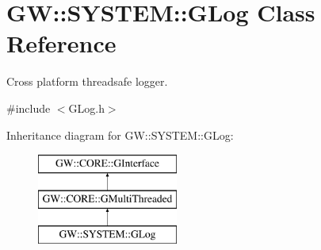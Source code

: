\hypertarget{class_g_w_1_1_s_y_s_t_e_m_1_1_g_log}{}\section{GW\+:\+:S\+Y\+S\+T\+EM\+:\+:G\+Log Class Reference}
\label{class_g_w_1_1_s_y_s_t_e_m_1_1_g_log}


Cross platform threadsafe logger.  




{\ttfamily \#include $<$G\+Log.\+h$>$}

Inheritance diagram for GW\+:\+:S\+Y\+S\+T\+EM\+:\+:G\+Log\+:\begin{figure}[H]
\begin{center}
\leavevmode
\includegraphics[height=3.000000cm]{class_g_w_1_1_s_y_s_t_e_m_1_1_g_log}
\end{center}
\end{figure}
